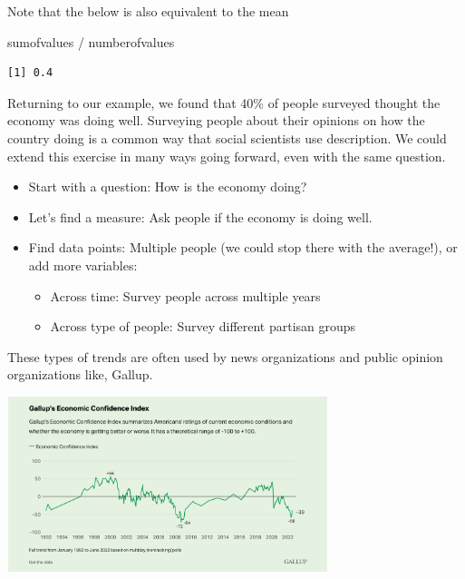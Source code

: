 \documentclass[
  letterpaper,
  DIV=11,
  numbers=noendperiod]{scrreprt}
\newenvironment{Shaded}{\begin{snugshade}}{\end{snugshade}}
\newcommand{\NormalTok}[1]{\textcolor[rgb]{0.00,0.23,0.31}{#1}}
\newcommand{\SpecialCharTok}[1]{\textcolor[rgb]{0.37,0.37,0.37}{#1}}
\providecommand{\tightlist}{%
  \setlength{\itemsep}{0pt}\setlength{\parskip}{0pt}}\usepackage{longtable,booktabs,array}
\begin{document}
Note that the below is also equivalent to the mean

\begin{Shaded}
\begin{Highlighting}[]
\NormalTok{sumofvalues }\SpecialCharTok{/}\NormalTok{ numberofvalues}
\end{Highlighting}
\end{Shaded}

\begin{verbatim}
[1] 0.4
\end{verbatim}

Returning to our example, we found that 40\% of people surveyed thought
the economy was doing well. Surveying people about their opinions on how
the country doing is a common way that social scientists use
description. We could extend this exercise in many ways going forward,
even with the same question.

\begin{itemize}
\tightlist
\item
  Start with a question: How is the economy doing?
\item
  Let's find a measure: Ask people if the economy is doing well.
\item
  Find data points: Multiple people (we could stop there with the
  average!), or add more variables:

  \begin{itemize}
  \tightlist
  \item
    Across time: Survey people across multiple years
  \item
    Across type of people: Survey different partisan groups
  \end{itemize}
\end{itemize}

These types of trends are often used by news organizations and public
opinion organizations like, Gallup.

\includegraphics[width=0.7\textwidth,height=\textheight]{images/gallupec.png}
\end{document}
